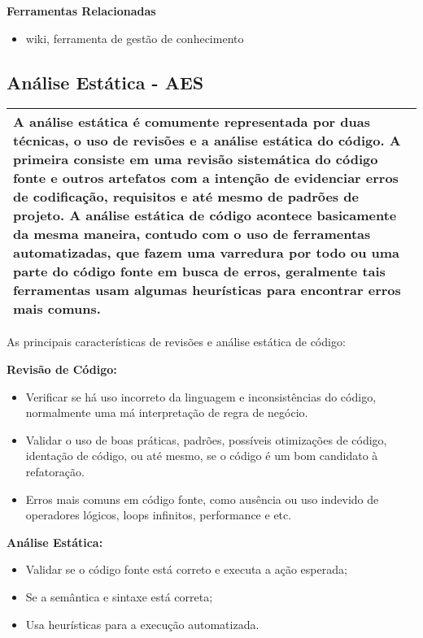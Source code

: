 \textbf{Ferramentas Relacionadas}
\begin{itemize}
    \item wiki, ferramenta de gestão de conhecimento
\end{itemize}

\subsection{Análise Estática - AES}
\label{sec:aes}

\begin{table}[!ht]
\centering
\begin{tabular}{|p{130mm}|}
\hline
A análise estática é comumente representada por duas técnicas, o uso de revisões e a análise estática do código. A primeira consiste em uma revisão sistemática do código fonte e outros artefatos com a intenção de evidenciar erros de codificação, requisitos e até mesmo de padrões de projeto. A análise estática de código acontece basicamente da mesma maneira, contudo com o uso de ferramentas automatizadas, que fazem uma varredura por todo ou uma parte do código fonte em busca de erros, geralmente tais ferramentas usam algumas heurísticas para encontrar erros mais comuns. \\ 
\hline
\end{tabular}
\end{table}

As principais características de revisões e análise estática de código:

\textbf{Revisão de Código:}
\begin{itemize}
    \item Verificar se há uso incorreto da linguagem e inconsistências do código, normalmente uma má interpretação de regra de negócio.
    \item Validar o uso de boas práticas, padrões, possíveis otimizações de código, identação de código, ou até mesmo, se o código é um bom candidato à refatoração.
    \item Erros mais comuns em código fonte, como ausência ou uso indevido de operadores lógicos, loops infinitos, performance e etc.
\end{itemize}

\textbf{Análise Estática:}
\begin{itemize}
    \item Validar se o código fonte está correto e executa a ação esperada;
    \item Se a semântica e sintaxe está correta;
    \item Usa heurísticas para a execução automatizada.
\end{itemize}

